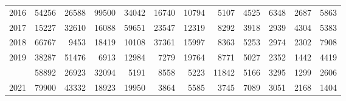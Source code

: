 \documentclass[
]{article}
\begin{document}
\begin{longtable}[t]{lrrrrrrrrrrr}
2016 & 54256 & 26588 & 99500 & 34042 & 16740 & 10794 & 5107 & 4525 & 6348 & 2687 & 5863\\
2017 & 15227 & 32610 & 16088 & 59651 & 23547 & 12319 & 8292 & 3918 & 2939 & 4304 & 5383\\
2018 & 66767 & 9453 & 18419 & 10108 & 37361 & 15997 & 8363 & 5253 & 2974 & 2302 & 7908\\
2019 & 38287 & 51476 & 6913 & 12984 & 7279 & 19764 & 8771 & 5027 & 2352 & 1442 & 4419\\
\addlinespace
2020 & 58892 & 26923 & 32094 & 5191 & 8558 & 5223 & 11842 & 5166 & 3295 & 1299 & 2606\\
2021 & 79900 & 43332 & 18923 & 19950 & 3864 & 5585 & 3745 & 7089 & 3051 & 2168 & 1404\\*
\end{longtable}
\end{document}
